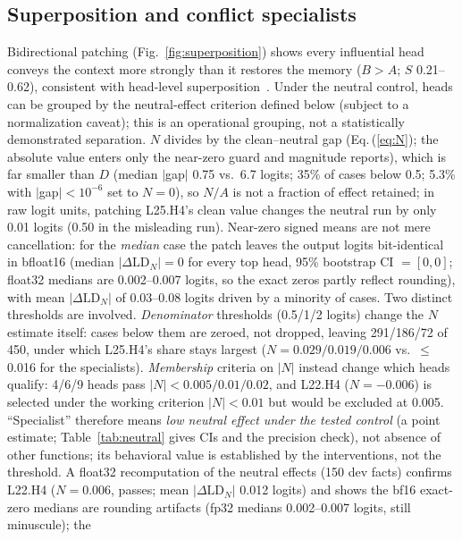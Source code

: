 \documentclass[paper]{ieice}
\newcommand{\spec}{L22.H4}
\begin{document}
\subsection{Superposition and conflict specialists}
\label{sec:results-superposition}

Bidirectional patching (Fig.~\ref{fig:superposition}) shows every
influential head conveys the context more strongly than it restores the
memory ($B>A$; $S$ 0.21--0.62), consistent with head-level
superposition~\cite{li2025juice}. Under the neutral control, heads can be grouped by the neutral-effect
criterion defined below (subject to a normalization caveat); this is an
operational grouping, not a statistically demonstrated separation.
$N$ divides by the clean--neutral gap (Eq.\,(\ref{eq:N}); the
absolute value enters only the near-zero guard and magnitude reports),
which is far smaller than $D$ (median $|$gap$|$ 0.75 vs.\ 6.7 logits;
35\% of cases below 0.5; 5.3\% with $|$gap$|{<}10^{-6}$ set to
$N{=}0$), so $N/A$ is not a fraction of effect retained; in raw logit units, patching L25.H4's clean value
changes the neutral run by only 0.01 logits (0.50 in the misleading
run). Near-zero signed means are not mere cancellation: for the
\emph{median} case the patch leaves the output logits bit-identical in
bfloat16 (median $|\Delta\mathrm{LD}_N|{=}0$ for every top head,
95\% bootstrap CI $=[0,0]$; float32 medians are 0.002--0.007 logits,
so the exact zeros partly reflect rounding), with mean
$|\Delta\mathrm{LD}_N|$ of 0.03--0.08 logits driven by a minority of
cases. Two distinct thresholds are involved. \emph{Denominator}
thresholds (0.5/1/2 logits) change the $N$ estimate itself: cases
below them are zeroed, not dropped, leaving 291/186/72 of 450, under
which L25.H4's share stays largest ($N{=}0.029/0.019/0.006$ vs.\
$\le$0.016 for the specialists). \emph{Membership} criteria on
$|N|$ instead change which heads qualify: 4/6/9 heads pass
$|N|{<}0.005/0.01/0.02$, and \spec{} ($N{=}-0.006$) is selected
under the working criterion $|N|{<}0.01$ but would be excluded at
0.005. ``Specialist'' therefore means \emph{low neutral
effect under the tested control} (a point estimate;
Table~\ref{tab:neutral} gives CIs and the precision check), not
absence of other functions; its behavioral value is established by the
interventions, not the threshold. A float32 recomputation of the neutral effects (150 dev
facts) confirms \spec{} ($N{=}0.006$, passes; mean $|\Delta\mathrm{LD}_N|$
0.012 logits) and shows the bf16 exact-zero medians are rounding
artifacts (fp32 medians 0.002--0.007 logits, still minuscule); the
\end{document}
